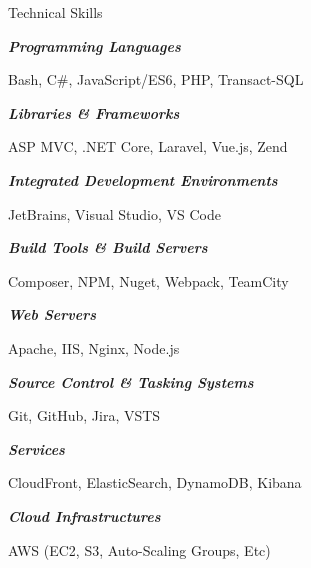 \documentclass{resume} %
\begin{document}

\begin{rSection}{Technical Skills}

\begin{rSubsection}{}{}{}{}

\item[] \textbf{\textit{Programming Languages}}
\item Bash, C\#, JavaScript/ES6, PHP, Transact-SQL
\vspace{3mm}

\item[] \textbf{\textit{Libraries \& Frameworks}}
\item ASP MVC, .NET Core, Laravel, Vue.js, Zend
\smallskip

\item[] \textbf{\textit{Integrated Development Environments}}
\item JetBrains, Visual Studio, VS Code
\vspace{3mm}

\item[] \textbf{\textit{Build Tools \& Build Servers}}
\item Composer, NPM, Nuget, Webpack, TeamCity
\vspace{3mm}

\item[] \textbf{\textit{Web Servers}}
\item Apache, IIS, Nginx, Node.js
\vspace{3mm}

\item[] \textbf{\textit{Source Control \& Tasking Systems}}
\item Git, GitHub, Jira, VSTS
\vspace{3mm}

\item[] \textbf{\textit{Services}}
\item CloudFront, ElasticSearch, DynamoDB, Kibana
\vspace{3mm}

\item[] \textbf{\textit{Cloud Infrastructures}}
\item AWS (EC2, S3, Auto-Scaling Groups, Etc)

\end{rSubsection}

\end{rSection}





\end{document}
